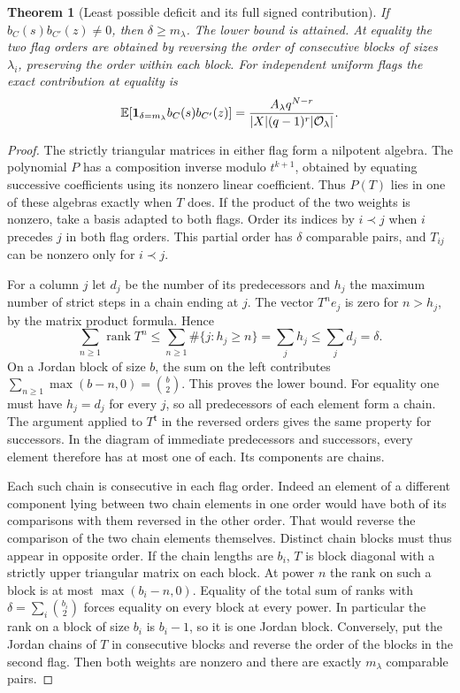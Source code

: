 \documentclass[a4paper,11pt]{article}
\newtheorem{theorem}[proposition]{Theorem}
\theoremstyle{definition}
\theoremstyle{remark}
\numberwithin{equation}{section}
\begin{document}
\begin{theorem}[Least possible deficit and its full signed contribution]
\leavevmode\label{thm:firstflag659}
If \(b_C(s)b_{C'}(z)\ne0\), then \(\delta\ge m_\lambda\).
The lower bound is attained. At equality the two flag orders
are obtained by reversing the order of consecutive blocks of
sizes \(\lambda_i\), preserving the order within each block.
For independent uniform flags the exact contribution at equality is
\[
   \mathbb E\!\left[{\bf1}_{\delta=m_\lambda} b_C(s)b_{C'}(z)\right]
     =\frac{A_\lambda q^{N-r}}{|X|(q-1)^r|\mathcal O_\lambda|}.
\]
\end{theorem}
\begin{proof}
The strictly triangular matrices in either flag form a nilpotent
algebra. The polynomial \(P\) has a composition inverse modulo
\(t^{k+1}\), obtained by equating successive coefficients using
its nonzero linear coefficient. Thus \(P(T)\) lies in one of
these algebras exactly when \(T\) does. If the product of the
two weights is nonzero, take a basis adapted to both flags.
Order its indices by \(i\prec j\) when \(i\) precedes \(j\) in
both flag orders. This partial order has \(\delta\) comparable
pairs, and \(T_{ij}\) can be nonzero only for \(i\prec j\).

For a column \(j\) let \(d_j\) be the number of its predecessors
and \(h_j\) the maximum number of strict steps in a chain ending
at \(j\). The vector \(T^n e_j\) is zero for \(n>h_j\), by the
matrix product formula. Hence
\[
 \sum_{n\ge1}\operatorname{rank}T^n
    \le\sum_{n\ge1}\#\{j:h_j\ge n\}
    =\sum_j h_j\le\sum_j d_j=\delta .
\]
On a Jordan block of size \(b\), the sum on the left contributes
\(\sum_{n\ge1}\max(b-n,0)=\binom b2\). This proves the lower
bound. For equality one must have \(h_j=d_j\) for every \(j\),
so all predecessors of each element form a chain. The argument
applied to \(T^{\mathsf t}\) in the reversed orders gives the
same property for successors. In the diagram of immediate
predecessors and successors, every element therefore has at most
one of each. Its components are chains.

Each such chain is consecutive in each flag order. Indeed an
element of a different component lying between two chain elements
in one order would have both of its comparisons with them reversed
in the other order. That would reverse the comparison of the
two chain elements themselves. Distinct chain blocks must thus
appear in opposite order. If the chain lengths are \(b_i\),
\(T\) is block diagonal with a strictly upper triangular matrix
on each block. At power \(n\) the rank on such a block is at
most \(\max(b_i-n,0)\). Equality of the total sum of ranks with
\(\delta=\sum_i\binom{b_i}{2}\) forces equality on every block
at every power. In particular the rank on a block of size \(b_i\)
is \(b_i-1\), so it is one Jordan block. Conversely, put the
Jordan chains of \(T\) in consecutive blocks and reverse the
order of the blocks in the second flag. Then both weights are
nonzero and there are exactly \(m_\lambda\) comparable pairs.


\end{proof}
\end{document}
